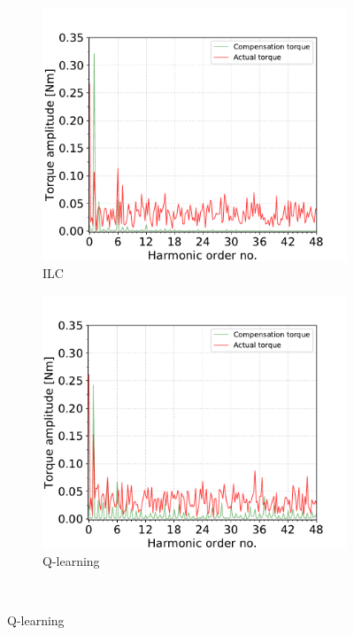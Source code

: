 \begin{figure}[hb]
\begin{subfigure}{.5\linewidth}
\centering
\includegraphics[width=\textwidth]{images/b-sim-ilc-enabled.pdf}
\caption{ILC}
\label{sim:a}
\end{subfigure}%
\begin{subfigure}{.5\linewidth}
\centering
\includegraphics[width=\textwidth]{images/b-sim-qlr-enabled.pdf}
\caption{Q-learning}
\label{sim:b}
\end{subfigure}\\[1ex]

\end{figure}
